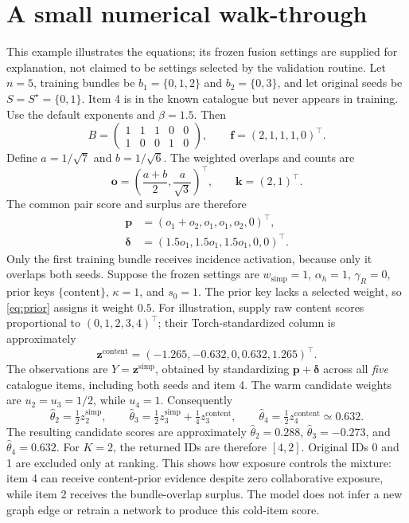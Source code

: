 \documentclass[11pt,a4paper]{article}
\newcommand{\sig}[1]{\mathrm{#1}}
\numberwithin{equation}{section}
\begin{document}
\section{A small numerical walk-through}\label{sec:example}
This example illustrates the equations; its frozen fusion settings are supplied for
explanation, not claimed to be settings selected by the validation routine. Let $n=5$,
training bundles be $b_1=\{0,1,2\}$ and $b_2=\{0,3\}$, and let original seeds be
$S=S^\star=\{0,1\}$. Item 4 is in the known catalogue but never appears in training.
Use the default exponents and $\beta=1.5$. Then
\begin{equation}
 B=\begin{pmatrix}1&1&1&0&0\\1&0&0&1&0\end{pmatrix},\qquad
 \bm f=(2,1,1,1,0)^\top.
\end{equation}
Define $a=1/\sqrt7$ and $b=1/\sqrt6$. The weighted overlaps and counts are
\begin{equation}
 \bm o=\left(\frac{a+b}{2},\frac{a}{\sqrt3}\right)^\top,
 \qquad \bm k=(2,1)^\top.
\end{equation}
The common pair score and surplus are therefore
\begin{align}
 \bm p&=(o_1+o_2,o_1,o_1,o_2,0)^\top,\\
 \bm\delta&=(1.5o_1,1.5o_1,1.5o_1,0,0)^\top.
\end{align}
Only the first training bundle receives incidence activation, because only it overlaps
both seeds. Suppose the frozen settings are $w_{\sig{simp}}=1$, $\alpha_h=1$,
$\gamma_R=0$, prior keys $\{\sig{content}\}$, $\kappa=1$, and $s_0=1$.
The prior key lacks a selected weight, so \eqref{eq:prior} assigns it weight $0.5$.
For illustration, supply raw content scores proportional to $(0,1,2,3,4)^\top$; their
Torch-standardized column is approximately
\begin{equation}
 \bm z^{\sig{content}}=(-1.265,-0.632,0,0.632,1.265)^\top.
\end{equation}
The observations are $Y=\bm z^{\sig{simp}}$, obtained by standardizing
$\bm p+\bm\delta$ across all \emph{five} catalogue items, including both seeds and item 4.
The warm candidate weights are $u_2=u_3=1/2$, while $u_4=1$. Consequently
\begin{equation}
 \widehat\theta_2=\tfrac12 z^{\sig{simp}}_2,\qquad
 \widehat\theta_3=\tfrac12 z^{\sig{simp}}_3+\tfrac14 z^{\sig{content}}_3,\qquad
 \widehat\theta_4=\tfrac12 z^{\sig{content}}_4\simeq0.632.
\end{equation}
The resulting candidate scores are approximately $\widehat\theta_2=0.288$,
$\widehat\theta_3=-0.273$, and $\widehat\theta_4=0.632$. For $K=2$, the returned
IDs are therefore $[4,2]$. Original IDs 0 and 1 are excluded only at ranking. This shows how exposure controls the
mixture: item 4 can receive content-prior evidence despite zero collaborative exposure,
while item 2 receives the bundle-overlap surplus. The model does not infer a new graph
edge or retrain a network to produce this cold-item score.
\end{document}
